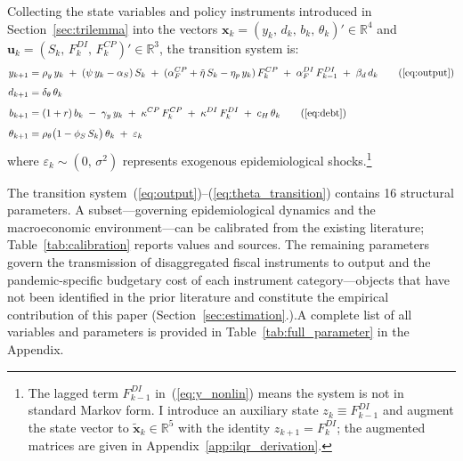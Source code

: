 \documentclass[12pt, a4paper]{article}
\begin{document}
Collecting the state variables and policy instruments introduced in
Section~\ref{sec:trilemma} into the vectors
$\bm{x}_k = (y_k,\, d_k,\, b_k,\, \theta_k)' \in \mathbb{R}^4$ and
$\bm{u}_k = (S_k,\, F_k^{DI},\, F_k^{CP})' \in \mathbb{R}^3$, the transition
system is:
%
\begin{align}
    y_{k+1} &= \rho_y\, y_k
    \;+\; (\psi\, y_k - \alpha_S)\, S_k
    \;+\; (\alpha_F^{CP} + \tilde{\eta}\, S_k - \eta_p\, y_k)\, F_k^{CP}
    \;+\; \alpha_F^{DI}\, F_{k-1}^{DI}
    \;+\; \beta_d\, d_k
    \tag{\ref{eq:output}} \\[1ex]
    d_{k+1} &= \delta_\theta\, \theta_k
    \label{eq:d_transition} \\[1ex]
    b_{k+1} &= (1+r)\, b_k \;-\; \gamma_y\, y_k
    \;+\; \kappa^{CP}\, F_k^{CP} \;+\; \kappa^{DI}\, F_k^{DI}
    \;+\; c_H\, \theta_k
    \tag{\ref{eq:debt}} \\[1ex]
    \theta_{k+1} &= \rho_\theta\bigl(1 - \phi_S\, S_k\bigr)\,\theta_k
    \;+\; \varepsilon_k
    \label{eq:theta_transition}
\end{align}
%
where $\varepsilon_k \sim (0,\, \sigma^2)$ represents exogenous
epidemiological shocks.\footnote{The lagged term $F_{k-1}^{DI}$
in~(\ref{eq:y_nonlin}) means the system is not in standard Markov form.
I introduce an auxiliary state $z_k \equiv F_{k-1}^{DI}$ and augment the
state vector to $\tilde{\bm{x}}_k \in \mathbb{R}^5$ with the identity
$z_{k+1} = F_k^{DI}$; the augmented matrices are given in
Appendix~\ref{app:ilqr_derivation}.}

\vspace{2mm}

\noindent The transition system~(\ref{eq:output})--(\ref{eq:theta_transition}) contains 16
structural parameters. A subset---governing epidemiological dynamics and the
macroeconomic environment---can be calibrated from the existing literature;
Table~\ref{tab:calibration} reports values and sources. The remaining parameters
govern the transmission of disaggregated fiscal instruments to output and the
pandemic-specific budgetary cost of each instrument category---objects that have not
been identified in the prior literature and constitute the empirical contribution of
this paper (Section~\ref{sec:estimation}.).A complete list of all variables and parameters is provided in Table~\ref{tab:full_parameter} in the Appendix.

\end{document}
